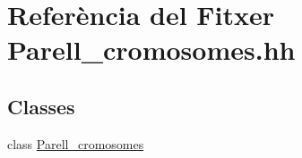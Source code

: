 \hypertarget{_parell__cromosomes_8hh}{}\section{Referència del Fitxer Parell\+\_\+cromosomes.\+hh}
\label{_parell__cromosomes_8hh}
\subsection*{Classes}
\begin{DoxyCompactItemize}
\item 
class \hyperlink{class_parell__cromosomes}{Parell\+\_\+cromosomes}
\end{DoxyCompactItemize}
